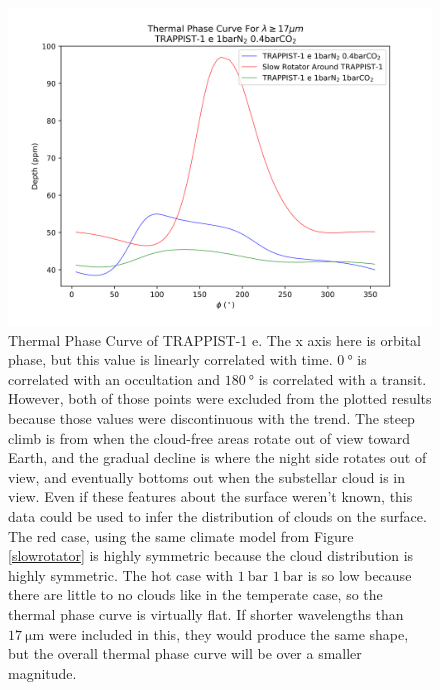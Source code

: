  \begin{figure}[ht]
    \begin{center}
        \includegraphics[width=\textwidth]{tpc/thermal_phase_curve.png}
        \caption[Thermal Phase Curve of TRAPPIST-1 e]{Thermal Phase Curve of
        TRAPPIST-1 e. The x axis here is orbital phase, but this value is
        linearly correlated with time. $\SI{0}{\degree}$ is correlated with an
        occultation and $\SI{180}{\degree}$ is correlated with a transit. 
        However, both of those points were excluded from the plotted results
        because those values were
        discontinuous with the trend. The steep climb is from when the
        cloud-free areas rotate out of view toward Earth, and the gradual decline
        is where
        the night side rotates out of view, and eventually bottoms out when the
        substellar cloud is in view. Even if these features about the surface
        weren't known, this data could be used to infer the distribution of
        clouds on the surface. The red case, using the same climate model from 
        Figure \ref{slowrotator} is highly symmetric because the cloud distribution
        is highly symmetric. The hot case with $\SI{1}{\bar}$ 
        $\SI{1}{\bar}$ 
        is so low because there are little to no clouds like in the temperate
        case, so the thermal phase curve is virtually flat. If shorter
        wavelengths than $\SI{17}{\micro\meter}$ were included in this, they
        would produce the same shape, but the overall thermal phase curve will
        be over a smaller magnitude.}
        \label{tpc}
    \end{center}
\end{figure}

